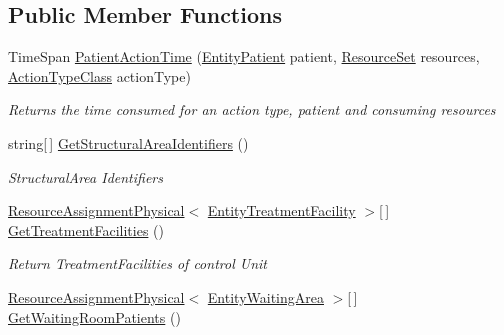 \subsection*{Public Member Functions}
\begin{DoxyCompactItemize}
\item 
Time\+Span \hyperlink{interface_general_health_care_elements_1_1_input_1_1_i_input_health_care_department_a1f2440ec8c8d21cd1f3462c8131a6e34}{Patient\+Action\+Time} (\hyperlink{class_general_health_care_elements_1_1_entities_1_1_entity_patient}{Entity\+Patient} patient, \hyperlink{class_general_health_care_elements_1_1_resource_handling_1_1_resource_set}{Resource\+Set} resources, \hyperlink{class_general_health_care_elements_1_1_general_classes_1_1_action_types_and_paths_1_1_action_type_class}{Action\+Type\+Class} action\+Type)
\begin{DoxyCompactList}\small\item\em Returns the time consumed for an action type, patient and consuming resources \end{DoxyCompactList}\item 
string\mbox{[}$\,$\mbox{]} \hyperlink{interface_general_health_care_elements_1_1_input_1_1_i_input_health_care_department_ab6dd850bdce49c44860c8c05e6898b63}{Get\+Structural\+Area\+Identifiers} ()
\begin{DoxyCompactList}\small\item\em Structural\+Area Identifiers \end{DoxyCompactList}\item 
\hyperlink{class_general_health_care_elements_1_1_resource_handling_1_1_resource_assignment_physical}{Resource\+Assignment\+Physical}$<$ \hyperlink{class_general_health_care_elements_1_1_entities_1_1_entity_treatment_facility}{Entity\+Treatment\+Facility} $>$\mbox{[}$\,$\mbox{]} \hyperlink{interface_general_health_care_elements_1_1_input_1_1_i_input_health_care_department_a7a237b9c42f628086a987d902df02d74}{Get\+Treatment\+Facilities} ()
\begin{DoxyCompactList}\small\item\em Return Treatment\+Facilities of control Unit \end{DoxyCompactList}\item 
\hyperlink{class_general_health_care_elements_1_1_resource_handling_1_1_resource_assignment_physical}{Resource\+Assignment\+Physical}$<$ \hyperlink{class_general_health_care_elements_1_1_entities_1_1_entity_waiting_area}{Entity\+Waiting\+Area} $>$\mbox{[}$\,$\mbox{]} \hyperlink{interface_general_health_care_elements_1_1_input_1_1_i_input_health_care_department_af1c63beebe4f45421572de5ce4c58aac}{Get\+Waiting\+Room\+Patients} ()

\end{DoxyCompactItemize}
